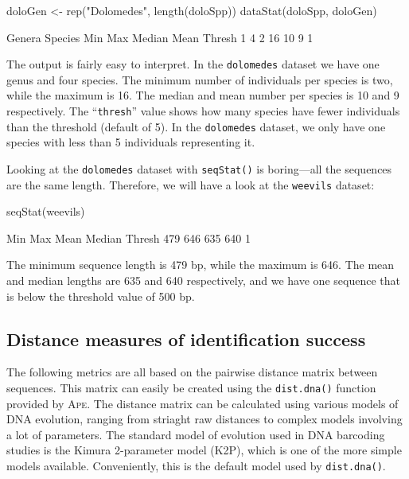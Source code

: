 \documentclass{article}
\newcommand{\progname}[1]{\textsc{#1}}
\newcommand{\fun}[1]{\texttt{#1}}
\begin{document}
\begin{console}
doloGen <- rep("Dolomedes", length(doloSpp))
dataStat(doloSpp, doloGen)
\end{console}

\begin{Routput}
 Genera Species     Min     Max  Median    Mean  Thresh 
      1       4       2      16      10       9       1 
\end{Routput}

The output is fairly easy to interpret. In the \fun{dolomedes} dataset we have one genus and four species. The minimum number of individuals per species is two, while the maximum is 16. The median and mean number per species is 10 and 9 respectively. The ``\fun{thresh}'' value shows how many species have fewer individuals than the threshold (default of 5). In the \fun{dolomedes} dataset, we only have one species with less than 5 individuals representing it.

Looking at the \fun{dolomedes} dataset with \fun{seqStat()} is boring---all the sequences are the same length. Therefore, we will have a look at the \fun{weevils} dataset:

\begin{console}
seqStat(weevils)
\end{console}

\begin{Routput}
   Min    Max   Mean Median Thresh 
   479    646    635    640      1
\end{Routput}

The minimum sequence length is 479 bp, while the maximum is 646. The mean and median lengths are 635 and 640 respectively, and we have one sequence that is below the threshold value of 500 bp.

\subsection{Distance measures of identification success}
The following metrics are all based on the pairwise distance matrix between sequences. This matrix can easily be created using the \fun{dist.dna()} function provided by \progname{Ape}. The distance matrix can be calculated using various models of DNA evolution, ranging from striaght raw distances to complex models involving a lot of parameters. The standard model of evolution used in DNA barcoding studies is the Kimura 2-parameter model (K2P), which is one of the more simple models available. Conveniently, this is the default model used by \fun{dist.dna()}.
\end{document}
